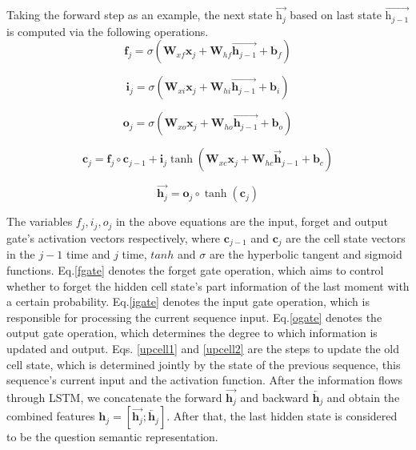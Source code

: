 \documentclass[pdflatex,sn-mathphys]{sn-jnl}%
\theoremstyle{thmstyleone}%
\theoremstyle{thmstyletwo}%
\theoremstyle{thmstylethree}%
\begin{document}
Taking the forward step as an example, the next state ${\overrightarrow{\mathrm{h}_{j}}}$ based on last state ${\overrightarrow{\mathrm{h}_{j-1}}}$ is computed via the following operations.
\begin{equation}
\label{fgate}
    \mathbf{f}_{j}=\sigma\left(\mathbf{W}_{x f} \mathbf{x}_{j}+\mathbf{W}_{h f} \overrightarrow{\mathbf{h}_{j-1}}+\mathbf{b}_{f}\right)
\end{equation}

\begin{equation}
\label{igate}
    \mathbf{i}_{j}=\sigma\left(\mathbf{W}_{x i} \mathbf{x}_{j}+\mathbf{W}_{h i} \overrightarrow{\mathbf{h}_{j-1}}+\mathbf{b}_{i}\right)
\end{equation}

\begin{equation}
\label{ogate}
    \mathbf{o}_{j}=\sigma\left(\mathbf{W}_{x o} \mathbf{x}_{j}+\mathbf{W}_{h o} \overrightarrow{\mathbf{h}_{j-1}}+\mathbf{b}_{o}\right)
\end{equation}

\begin{equation}
\label{upcell1}
\mathbf{c}_{j}=\mathbf{f}_{j} \circ \mathbf{c}_{j-1}+\mathbf{i}_{j} \tanh \left(\mathbf{W}_{x c} \mathbf{x}_{j}+\mathbf{W}_{h c} \overrightarrow{\mathbf{h}}_{j-1}+\mathbf{b}_{c}\right)
\end{equation}

\begin{equation}
\label{upcell2}
\overrightarrow{\mathbf{h}_{j}}=\mathbf{o}_{j} \circ \tanh \left(\mathbf{c}_{j}\right)
\end{equation}

The variables $f_{j}, i_{j}, o_{j}$ in the above equations are the input, forget and output gate's activation vectors respectively, where $\mathbf{c}_{j-1}$ and $\mathbf{c}_{j}$ are the cell state vectors in the $j-1$ time and $j$ time, $tanh$ and $\sigma$ are the hyperbolic tangent and sigmoid functions.
Eq.\ref{fgate} denotes the forget gate operation, which aims to control whether to forget the hidden cell state's part information of the last moment with a certain probability. Eq.\ref{igate} denotes the input gate operation, which is responsible for processing the current sequence input. Eq.\ref{ogate} denotes the output gate operation, which determines the degree to which information is updated and output. Eqs. \ref{upcell1} and \ref{upcell2} are the steps to update the old cell state, which is determined jointly by the state of the previous sequence, this sequence's current input and the activation function.
After the information flows through LSTM, we concatenate the forward $\overrightarrow{\mathbf{h}_{j}}$ and backward $\overleftarrow{\mathbf{h}_{j}}$ and obtain the combined features $\mathbf{h}_{j} = [\overrightarrow{\mathbf{h}_{j}};\overleftarrow{\mathbf{h}_{j}}]$. After that, the last hidden state is considered to be the question semantic representation.
 
\end{document}
